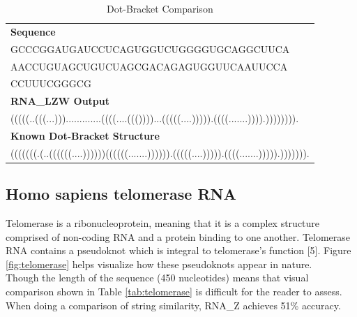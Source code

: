 \documentclass[sigconf]{acmart}
\begin{document}
\begin{table}
  \caption{Dot-Bracket Comparison}
  \label{tab:tRNA}
  \begin{tabular}{l}
    \textbf{Sequence}\\
    GCCCGGAUGAUCCUCAGUGGUCUGGGGUGCAGGCUUCA\\
    AACCUGUAGCUGUCUAGCGACAGAGUGGUUCAAUUCCA\\
    CCUUUCGGGCG\\
    \midrule
    \textbf{RNA\_LZW Output}\\
	(((((..(((...))).............((((....((())))...(((((....))))).((((.......)))).)))))))).\\
    \midrule 
    \textbf{Known Dot-Bracket Structure}\\
    (((((((.(..((((((....))))))((((((.......)))))).(((((....))))).((((.......))))).))))))).\\
\end{tabular}
\end{table}


\subsection{Homo sapiens telomerase RNA}

Telomerase is a ribonucleoprotein, meaning that it is a complex structure comprised of non-coding RNA and a protein binding to one another. Telomerase RNA contains a pseudoknot which is integral to telomerase's function [5].  Figure \ref{fig:telomerase} helps visualize how these pseudoknots appear in nature.\\
Though the length of the sequence (450 nucleotides) means that visual comparison shown in Table \ref{tab:telomerase} is difficult for the reader to assess. When doing a comparison of string similarity, RNA\_Z achieves 51\% accuracy.
\end{document}
